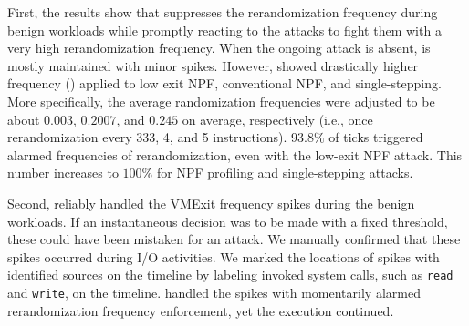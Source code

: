 First, the results show that \thename suppresses the rerandomization frequency during benign workloads while
promptly reacting to the attacks to fight them with a very high rerandomization frequency.
When the ongoing attack is absent,  is mostly maintained with minor spikes.
However, \thename showed drastically higher frequency () applied to low exit NPF, conventional NPF, and single-stepping.
More specifically, the average randomization frequencies were adjusted to be about $0.003$, $0.2007$, and $0.245$ on average, respectively (i.e., once rerandomization every 333, 4, and 5 instructions).
$93.8\%$ of ticks triggered alarmed frequencies of rerandomization, even with the low-exit NPF attack.
This number increases to $100\%$ for NPF profiling and single-stepping attacks.

Second, \thename reliably handled the VMExit frequency spikes during the benign workloads.
If an instantaneous decision was to be made with a fixed threshold, these could have been mistaken for an attack.
We manually confirmed that these spikes occurred during I/O activities.
We marked the locations of spikes with identified sources on the timeline by labeling invoked system calls, such as \texttt{read} and \texttt{write}, on the timeline.
\thename handled the spikes with momentarily alarmed rerandomization frequency enforcement, yet the execution continued.

